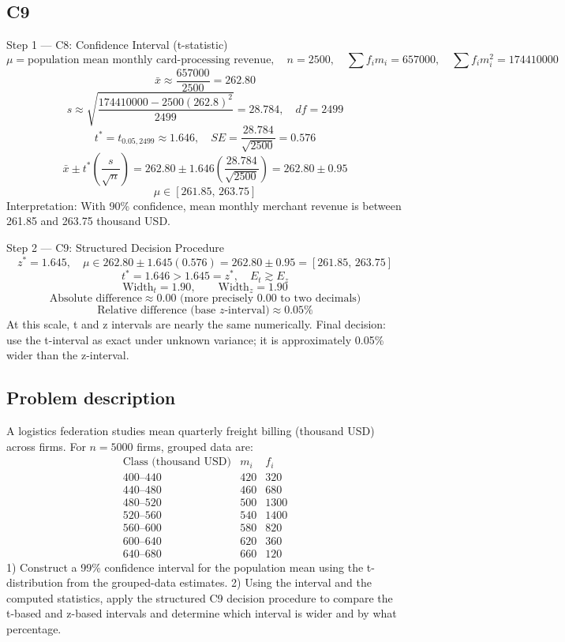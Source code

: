 \begin{ExamProblems}
		\subsection*{C9}
		Step 1 --- C8: Confidence Interval (t-statistic)
		\[
		\mu=\text{population mean monthly card-processing revenue},\quad n=2500,\quad \sum f_im_i=657000,\quad \sum f_im_i^2=174410000
		\]
		\[
		\bar{x}\approx\frac{657000}{2500}=262.80
		\]
		\[
		s\approx\sqrt{\frac{174410000-2500(262.8)^2}{2499}}=28.784,\quad df=2499
		\]
		\[
		t^*=t_{0.05,2499}\approx 1.646,\quad SE=\frac{28.784}{\sqrt{2500}}=0.576
		\]
		\[
		\bar{x}\pm t^*\left(\frac{s}{\sqrt{n}}\right)=262.80\pm 1.646\left(\frac{28.784}{\sqrt{2500}}\right)=262.80\pm 0.95
		\]
		\[
		\mu\in[261.85,\,263.75]
		\]
		Interpretation: With 90\% confidence, mean monthly merchant revenue is between 261.85 and 263.75 thousand USD.

		Step 2 --- C9: Structured Decision Procedure
		\[
		z^*=1.645,\quad \mu\in 262.80\pm 1.645(0.576)=262.80\pm 0.95=[261.85,\,263.75]
		\]
		\[
		t^*=1.646>1.645=z^*,\quad E_t\gtrsim E_z
		\]
		\[
		\text{Width}_t=1.90,\qquad \text{Width}_z=1.90
		\]
		\[
		\text{Absolute difference}\approx 0.00\text{ (more precisely }0.00\text{ to two decimals)}
		\]
		\[
		\text{Relative difference (base }z\text{-interval)}\approx 0.05\%
		\]
		At this scale, t and z intervals are nearly the same numerically.
		Final decision: use the t-interval as exact under unknown variance; it is approximately 0.05\% wider than the z-interval.

		\newpage
		\item
		\subsection*{Problem description}
		A logistics federation studies mean quarterly freight billing (thousand USD) across firms.
		For $n=5000$ firms, grouped data are:
		\[
		\begin{array}{c|c|c}
		\text{Class (thousand USD)} & m_i & f_i\\\hline
		400\text{--}440 & 420 & 320\\
		440\text{--}480 & 460 & 680\\
		480\text{--}520 & 500 & 1300\\
		520\text{--}560 & 540 & 1400\\
		560\text{--}600 & 580 & 820\\
		600\text{--}640 & 620 & 360\\
		640\text{--}680 & 660 & 120
		\end{array}
		\]
		1) Construct a 99\% confidence interval for the population mean using the t-distribution from the grouped-data estimates.
		2) Using the interval and the computed statistics, apply the structured C9 decision procedure to compare the t-based and z-based intervals and determine which interval is wider and by what percentage.


\end{ExamProblems}
